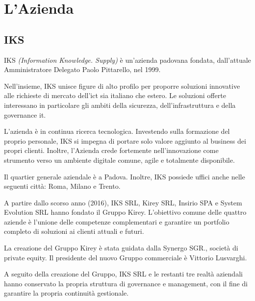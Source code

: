 
\chapter{L'Azienda}
\label{cap:azienda}
\vspace{20pt}

\section{IKS}
IKS \emph{(Information Knowledge. Supply)} è un'azienda padovana 
fondata, dall'attuale Amministratore Delegato Paolo Pittarello, nel 1999. 

Nell'insieme, IKS unisce figure di alto profilo per proporre soluzioni 
innovative alle richieste di mercato dell'\gls{ict} sia italiano che 
estero. Le soluzioni offerte interessano in particolare gli ambiti 
della sicurezza, dell'infrastruttura e della governance \gls{it}.  

L'azienda è in continua ricerca tecnologica. Investendo sulla formazione 
del proprio personale, IKS si impegna di portare solo valore aggiunto 
al business dei propri clienti. Inoltre, l'Azienda crede fortemente 
nell'innovazione come strumento verso un ambiente digitale comune, 
\gls{agile} e totalmente disponibile. 

Il quartier generale aziendale è a Padova. Inoltre, IKS possiede uffici 
anche nelle seguenti città: Roma, Milano e Trento.

A partire dallo scorso anno (2016), IKS SRL, Kirey SRL, Insirio SPA e 
System Evolution SRL hanno  fondato il Gruppo Kirey. L'obiettivo comune 
delle quattro aziende è l'unione delle competenze complementari e 
garantire un portfolio completo di soluzioni ai clienti attuali e futuri. 

La creazione del Gruppo Kirey è stata guidata dalla Synergo SGR., società di 
\gls{private equity}. Il presidente del nuovo Gruppo commerciale è Vittorio 
Lusvarghi.   

A seguito della creazione del Gruppo, IKS SRL e le restanti tre realtà 
aziendali hanno conservato la propria struttura di governance e management, 
con il fine di garantire la propria continuità gestionale. 

